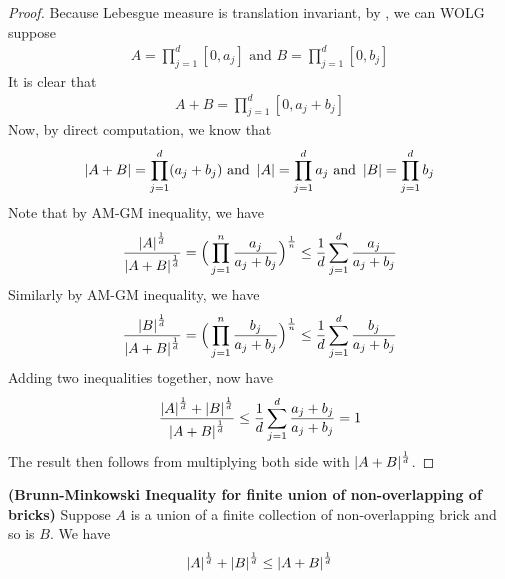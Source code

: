 \documentclass{report}
\begin{document}
\begin{proof}
Because Lebesgue measure is translation invariant, by  , we can WOLG suppose 
\begin{align*}
A=\prod_{j=1}^d [0,a_j]\text{ and }B=\prod_{j=1}^d [0,b_j]
\end{align*}
It is clear that 
\begin{align*}
A+B= \prod_{j=1}^d [0,a_j+b_j]
\end{align*}
Now, by direct computation, we know that 
\begin{align*}
\left|A+B\right|=\prod_{j=1}^d (a_j+b_j)\text{ and }\left|A\right|=\prod_{j=1}^d a_j\text{ and }\left|B\right|=\prod_{j=1}^d b_j
\end{align*}
Note that by AM-GM inequality, we have 
\begin{align*}
\frac{\left|A\right|^{\frac{1}{d}}}{\left|A+B\right|^{\frac{1}{d}}}=\Big(\prod_{j=1}^n \frac{a_j}{a_j+b_j}\Big)^{\frac{1}{n}}\leq \frac{1}{d}\sum_{j=1}^d \frac{a_j}{a_j+b_j}
\end{align*}
Similarly by AM-GM inequality, we have
\begin{align*}
\frac{\left|B\right|^{\frac{1}{d}}}{\left|A+B\right|^{\frac{1}{d}}}=\Big(\prod_{j=1}^n \frac{b_j}{a_j+b_j}\Big)^{\frac{1}{n}}\leq \frac{1}{d}\sum_{j=1}^d \frac{b_j}{a_j+b_j}
\end{align*}
Adding two inequalities together, now have 
\begin{align*}
\frac{\left|A\right|^{\frac{1}{d}}+\left|B\right|^{\frac{1}{d}}}{\left|A+B\right|^{\frac{1}{d}}}\leq \frac{1}{d}\sum_{j=1}^d \frac{a_j+b_j}{a_j+b_j}=1
\end{align*}
The result then follows from multiplying both side with $\left|A+B\right|^{\frac{1}{d}}$. 
\end{proof}
\begin{theorem}
\label{BMIb}
\textbf{(Brunn-Minkowski Inequality for finite union of non-overlapping of bricks)} Suppose $A$ is a union of a finite collection of non-overlapping brick and so is $B$. We have 
 \begin{align*}
\left|A\right|^{\frac{1}{d}}+ \left|B\right|^{\frac{1}{d}}\leq \left|A+B\right|^{\frac{1}{d}}
\end{align*}
\end{theorem}
\end{document}
